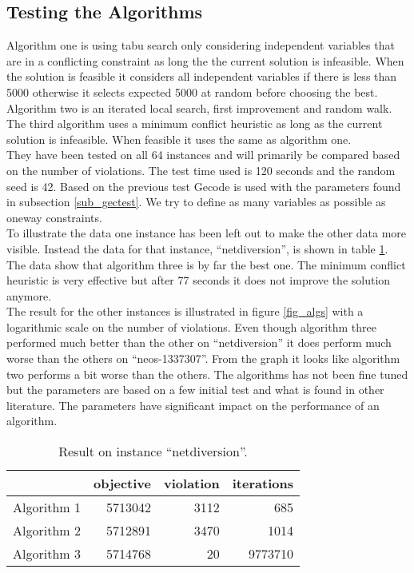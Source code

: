 \subsection{Testing the Algorithms}
Algorithm one is using tabu search only considering independent variables that are in a conflicting constraint as long 
the the current solution is infeasible. When the solution is feasible it considers all independent variables if there 
is less than 5000 otherwise it selects expected 5000 at random before choosing the best. \\ 
Algorithm two is an iterated local search, first improvement and random walk. The third algorithm uses a minimum 
conflict heuristic as long as the current solution is infeasible. When feasible it uses the same as algorithm one. \\ 
They have been tested on all 64 instances and will primarily be compared based on the number of violations. The test 
time used is 120 seconds and the random seed is 42. Based on the previous test Gecode is used with the parameters found 
in subsection \ref{sub_gectest}. We try to define as many variables as possible as oneway constraints. \\ 
To illustrate the data one instance has been left out to make the other data more visible. Instead the data for that 
instance, ``netdiversion'', is shown in table \ref{tab_netd}. The data show that algorithm three is by far the best 
one. The minimum conflict heuristic is very effective but after 77 seconds it does not improve the solution anymore. \\ 
The result for the other instances is illustrated in figure \ref{fig_algs} with a logarithmic scale on the number of 
violations. Even though algorithm three performed much better than the other on ``netdiversion'' it does perform much 
worse than the others on ``neos-1337307''. From the graph it looks like algorithm two performs a bit worse than the 
others. The algorithms has not been fine tuned but the parameters are based on a few initial test and what is found in 
other literature. The parameters have significant impact on the performance of an algorithm. \\ 

\begin{table}[b]
\centering
\begin{tabular}{|r|r|r|r|}
\hline
            & objective    & violation & iterations \\ \hline
Algorithm 1 & 5713042 & 3112      & 685        \\ \hline
Algorithm 2 & 5712891 & 3470      & 1014       \\ \hline
Algorithm 3 & 5714768 & 20        & 9773710    \\ \hline
\end{tabular}
\caption{Result on instance ``netdiversion''.}
\label{tab_netd}
\end{table}


